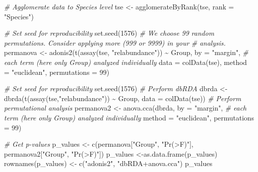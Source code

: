 \documentclass[
]{book}
\newenvironment{Shaded}{\begin{snugshade}}{\end{snugshade}}
\newcommand{\AttributeTok}[1]{\textcolor[rgb]{0.77,0.63,0.00}{#1}}
\newcommand{\CommentTok}[1]{\textcolor[rgb]{0.56,0.35,0.01}{\textit{#1}}}
\newcommand{\DecValTok}[1]{\textcolor[rgb]{0.00,0.00,0.81}{#1}}
\newcommand{\FunctionTok}[1]{\textcolor[rgb]{0.00,0.00,0.00}{#1}}
\newcommand{\NormalTok}[1]{#1}
\newcommand{\OtherTok}[1]{\textcolor[rgb]{0.56,0.35,0.01}{#1}}
\newcommand{\SpecialCharTok}[1]{\textcolor[rgb]{0.00,0.00,0.00}{#1}}
\newcommand{\StringTok}[1]{\textcolor[rgb]{0.31,0.60,0.02}{#1}}
\begin{document}
\begin{Shaded}
\begin{Highlighting}[]
\CommentTok{\# Agglomerate data to Species level}
\NormalTok{tse }\OtherTok{\textless{}{-}} \FunctionTok{agglomerateByRank}\NormalTok{(tse,}
                         \AttributeTok{rank =} \StringTok{"Species"}\NormalTok{)}

\CommentTok{\# Set seed for reproducibility}
\FunctionTok{set.seed}\NormalTok{(}\DecValTok{1576}\NormalTok{)}
\CommentTok{\# We choose 99 random permutations. Consider applying more (999 or 9999) in your}
\CommentTok{\# analysis. }
\NormalTok{permanova }\OtherTok{\textless{}{-}} \FunctionTok{adonis2}\NormalTok{(}\FunctionTok{t}\NormalTok{(}\FunctionTok{assay}\NormalTok{(tse, }\StringTok{"relabundance"}\NormalTok{)) }\SpecialCharTok{\textasciitilde{}}\NormalTok{ Group,}
                     \AttributeTok{by =} \StringTok{"margin"}\NormalTok{, }\CommentTok{\# each term (here only \textquotesingle{}Group\textquotesingle{}) analyzed individually}
                     \AttributeTok{data =} \FunctionTok{colData}\NormalTok{(tse),}
                     \AttributeTok{method =} \StringTok{"euclidean"}\NormalTok{,}
                     \AttributeTok{permutations =} \DecValTok{99}\NormalTok{)}

\CommentTok{\# Set seed for reproducibility}
\FunctionTok{set.seed}\NormalTok{(}\DecValTok{1576}\NormalTok{)}
\CommentTok{\# Perform dbRDA}
\NormalTok{dbrda }\OtherTok{\textless{}{-}} \FunctionTok{dbrda}\NormalTok{(}\FunctionTok{t}\NormalTok{(}\FunctionTok{assay}\NormalTok{(tse,}\StringTok{"relabundance"}\NormalTok{)) }\SpecialCharTok{\textasciitilde{}}\NormalTok{ Group, }
               \AttributeTok{data =} \FunctionTok{colData}\NormalTok{(tse))}
\CommentTok{\# Perform permutational analysis}
\NormalTok{permanova2 }\OtherTok{\textless{}{-}} \FunctionTok{anova.cca}\NormalTok{(dbrda,}
                        \AttributeTok{by =} \StringTok{"margin"}\NormalTok{, }\CommentTok{\# each term (here only \textquotesingle{}Group\textquotesingle{}) analyzed individually}
                        \AttributeTok{method =} \StringTok{"euclidean"}\NormalTok{,}
                        \AttributeTok{permutations =} \DecValTok{99}\NormalTok{)}

\CommentTok{\# Get p{-}values}
\NormalTok{p\_values }\OtherTok{\textless{}{-}} \FunctionTok{c}\NormalTok{(permanova[}\StringTok{"Group"}\NormalTok{, }\StringTok{"Pr(\textgreater{}F)"}\NormalTok{], permanova2[}\StringTok{"Group"}\NormalTok{, }\StringTok{"Pr(\textgreater{}F)"}\NormalTok{])}
\NormalTok{p\_values }\OtherTok{\textless{}{-}}\FunctionTok{as.data.frame}\NormalTok{(p\_values)}
\FunctionTok{rownames}\NormalTok{(p\_values) }\OtherTok{\textless{}{-}} \FunctionTok{c}\NormalTok{(}\StringTok{"adonis2"}\NormalTok{, }\StringTok{"dbRDA+anova.cca"}\NormalTok{)}
\NormalTok{p\_values}
\end{Highlighting}
\end{Shaded}
\end{document}
